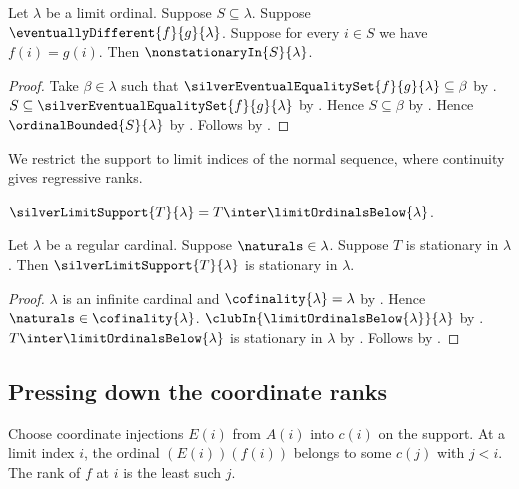 \begin{proposition}\label{eventually_different_agreement_set_nonstationary}
    Let $\lambda$ be a limit ordinal.
    Suppose $S\subseteq\lambda$.
    Suppose $\eventuallyDifferent{f}{g}{\lambda}$.
    Suppose for every $i\in S$ we have $f(i)=g(i)$.
    Then $\nonstationaryIn{S}{\lambda}$.
\end{proposition}
\begin{proof}
    Take $\beta\in\lambda$ such that
        $\silverEventualEqualitySet{f}{g}{\lambda}\subseteq\beta$
        by .
    $S\subseteq\silverEventualEqualitySet{f}{g}{\lambda}$
        by .
    Hence $S\subseteq\beta$ by .
    Hence $\ordinalBounded{S}{\lambda}$
        by .
    Follows by .
\end{proof}

We restrict the support to limit indices of the normal sequence, where
continuity gives regressive ranks.

\begin{definition}\label{silver_limit_support}
    $\silverLimitSupport{T}{\lambda}
        =T\inter\limitOrdinalsBelow{\lambda}$.
\end{definition}

\begin{theorem}\label{silver_limit_support_is_stationary}
    Let $\lambda$ be a regular cardinal.
    Suppose $\naturals\in\lambda$.
    Suppose $T$ is stationary in $\lambda$.
    Then $\silverLimitSupport{T}{\lambda}$ is stationary in $\lambda$.
\end{theorem}
\begin{proof}
    $\lambda$ is an infinite cardinal and
        $\cofinality{\lambda}=\lambda$ by .
    Hence $\naturals\in\cofinality{\lambda}$.
    $\clubIn{\limitOrdinalsBelow{\lambda}}{\lambda}$
        by .
    $T\inter\limitOrdinalsBelow{\lambda}$ is stationary in $\lambda$
        by .
    Follows by .
\end{proof}

\subsection{Pressing down the coordinate ranks}

Choose coordinate injections $E(i)$ from $A(i)$ into $c(i)$ on the support.
At a limit index $i$, the ordinal $(E(i))(f(i))$ belongs to some $c(j)$
with $j<i$. The rank of $f$ at $i$ is the least such $j$.

